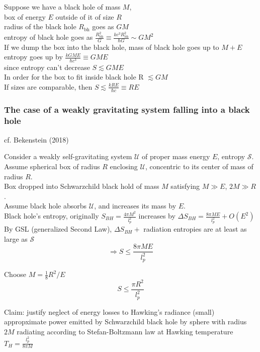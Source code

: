\documentclass[10pt]{amsart}
\begin{document}
\begin{multicols*}{2}
Suppose we have a black hole of mass $M$, \\
box of energy $E$ outside of it of size $R$ \\
radius of the black hole $R_{\text{bh}}$ goes as $GM$ \\
entropy of black hole goes as $\frac{ R^2_{\text{bh}} }{ G} \equiv \frac{ kc^3 R^2_{\text{bh}} }{\hbar G} \sim GM^2$ \\

If we dump the box into the black hole, mass of black hole goes up to $M + E$ \\

entropy goes up by $\frac{kGME}{\hbar c^3} \equiv GME$ \\
since entropy can't decrease $S \lesssim GME$ \\
In order for the box to fit inside black hole R $\lesssim GM$ \\
If sizes are comparable, then $S \lesssim \frac{kRE}{\hbar c} \equiv RE$ \\

\subsubsection{The case of a weakly gravitating system falling into a black hole}
cf. Bekenstein (2018) \cite{Beke2018}

Consider a weakly self-gravitating system $\mathcal{U}$ of proper mass energy $E$, entropy $\mathcal{S}$. \\
Assume spherical box of radius $R$ enclosing $\mathcal{U}$, concentric to its center of mass of radius $R$. \\
Box dropped into Schwarzchild black hold of mass $M$ satisfying $M\gg E$, $2M \gg R$. \\
Assume black hole absorbs $\mathcal{U}$, and increases its mass by $E$. \\

Black hole's entropy, originally $S_{BH} = \frac{4\pi M^2}{l_p^2}$ increases by $\Delta S_{BH} = \frac{8 \pi ME}{l_p^2} + O(E^2)$ \\

By GSL (generalized Second Law), $\Delta S_{BH} +$ radiation entropies are at least as large as $\mathcal{S}$
\[
\Longrightarrow S \leq \frac{8 \pi ME}{ l_p^2}
\]

Choose $M = \frac{1}{8} R^2/ E$
\[
S \leq \frac{ \pi R^2}{ l_p^2}
\]

Claim: justify neglect of energy losses to Hawking's radiance (small) \\
appropximate power emitted by Schwarzchild black hole by sphere with radius $2M$ radiating according to Stefan-Boltzmann law at Hawking temperature $T_H = \frac{l_p^2}{ 8\pi M}$


\end{multicols*}
\end{document}
